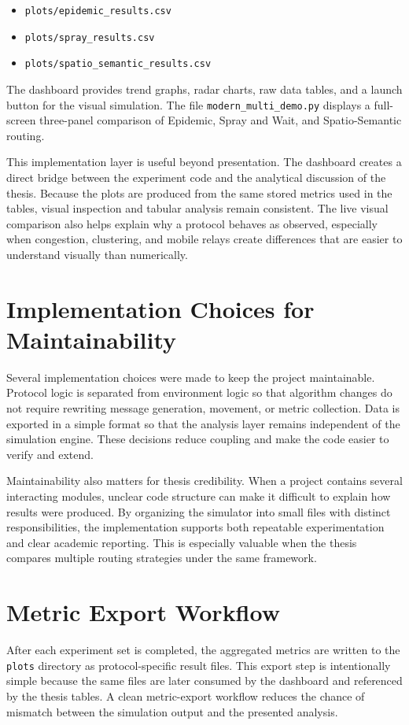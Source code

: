\begin{itemize}
	\item \verb|plots/epidemic_results.csv|
	\item \verb|plots/spray_results.csv|
	\item \verb|plots/spatio_semantic_results.csv|
\end{itemize}

The dashboard provides trend graphs, radar charts, raw data tables, and a launch button for the visual simulation. The file \verb|modern_multi_demo.py| displays a full-screen three-panel comparison of Epidemic, Spray and Wait, and Spatio-Semantic routing.

This implementation layer is useful beyond presentation. The dashboard creates a direct bridge between the experiment code and the analytical discussion of the thesis. Because the plots are produced from the same stored metrics used in the tables, visual inspection and tabular analysis remain consistent. The live visual comparison also helps explain why a protocol behaves as observed, especially when congestion, clustering, and mobile relays create differences that are easier to understand visually than numerically.

\section{Implementation Choices for Maintainability}
Several implementation choices were made to keep the project maintainable. Protocol logic is separated from environment logic so that algorithm changes do not require rewriting message generation, movement, or metric collection. Data is exported in a simple format so that the analysis layer remains independent of the simulation engine. These decisions reduce coupling and make the code easier to verify and extend.

Maintainability also matters for thesis credibility. When a project contains several interacting modules, unclear code structure can make it difficult to explain how results were produced. By organizing the simulator into small files with distinct responsibilities, the implementation supports both repeatable experimentation and clear academic reporting. This is especially valuable when the thesis compares multiple routing strategies under the same framework.

\section{Metric Export Workflow}
After each experiment set is completed, the aggregated metrics are written to the \verb|plots| directory as protocol-specific result files. This export step is intentionally simple because the same files are later consumed by the dashboard and referenced by the thesis tables. A clean metric-export workflow reduces the chance of mismatch between the simulation output and the presented analysis.

